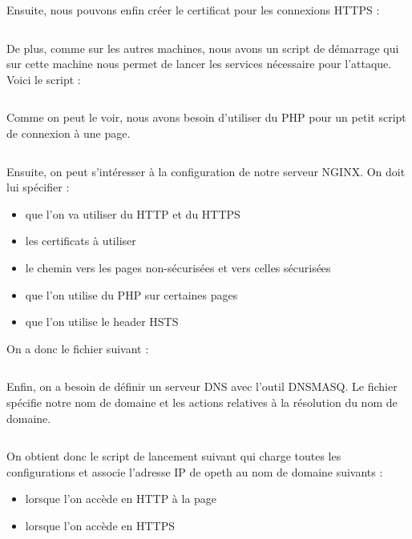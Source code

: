 \inputminted[bgcolor=lbcolor, breaklines]{shell}{../CA/create-ca.sh}

Ensuite, nous pouvons enfin créer le certificat pour les connexions HTTPS :

\inputminted[bgcolor=lbcolor, breaklines]{shell}{../CA/new-cert.sh}

De plus, comme sur les autres machines, nous avons un script de démarrage qui sur cette machine nous permet de lancer les services nécessaire pour l'attaque. Voici le script :

\inputminted[bgcolor=lbcolor, breaklines]{shell}{../sslstrip2/opeth/start.sh}

Comme on peut le voir, nous avons besoin d'utiliser du PHP pour un petit script de connexion à une page.

\inputminted[bgcolor=lbcolor, breaklines]{shell}{../sslstrip2/opeth/php7.0-fpm.conf}

Ensuite, on peut s'intéresser à la configuration de notre serveur NGINX. On doit lui spécifier :

\begin{itemize}
\item que l'on va utiliser du HTTP et du HTTPS
\item les certificats à utiliser
\item le chemin vers les pages non-sécurisées et vers celles sécurisées
\item que l'on utilise du PHP sur certaines pages
\item que l'on utilise le header HSTS
\end{itemize}

On a donc le fichier suivant  :

\inputminted[bgcolor=lbcolor, breaklines]{shell}{../sslstrip2/opeth/nginx.conf}

Enfin, on a besoin de définir un serveur DNS avec l'outil DNSMASQ. Le fichier  spécifie notre nom de domaine et les actions relatives à la résolution du nom de domaine.

\inputminted[bgcolor=lbcolor, breaklines]{shell}{../sslstrip2/opeth/dnsmasq.conf}

On obtient donc le script de lancement suivant qui charge toutes les configurations et associe l'adresse IP de opeth au nom de domaine suivants :

\begin{itemize}
\item {} lorsque l'on accède en HTTP à la page
\item {} lorsque l'on accède en HTTPS
\end{itemize}

